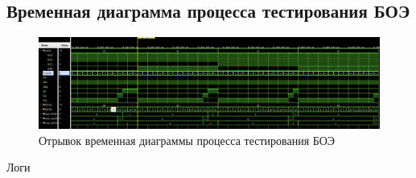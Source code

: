 \documentclass[12pt,onecolumn]{article}
\begin{document}
\subsection{Временная диаграмма процесса тестирования БОЭ}
\begin{figure}[H]
    \centering
    \includegraphics[width=\textwidth]{image/verilog-diagram.png}
    \caption{Отрывок временная диаграммы процесса тестирования БОЭ}
\end{figure}

Логи
\end{document}
